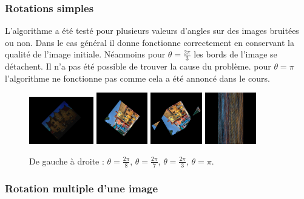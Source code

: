 \subsubsection{Rotations simples}


L'algorithme a été testé pour plusieurs valeurs d'angles sur des images bruitées ou non. Dans le cas général il donne fonctionne correctement en conservant la qualité de l'image initiale. Néanmoins pour $\theta = \frac{2\pi}{3}$ les bords de l'image se détachent. Il n'a pas été possible de trouver la cause du problème. 
pour $\theta = \pi$ l'algorithme ne fonctionne pas comme cela a été annoncé dans le cours. 

\begin{figure}[h]
	\includegraphics[width=0.25\textwidth]{castle_bruite_2pi_over_8.png}
	\includegraphics[width=0.20\textwidth]{house_rotation_2pi_over_7.png}
    \includegraphics[width=0.20\textwidth]{house_rotation_2pi_over_3.png}
    \includegraphics[width=0.20\textwidth]{house_rotation_pi.png}
    \caption{De gauche à droite : $\theta = \frac{2\pi}{8}$, $\theta = \frac{2\pi}{7}$, $\theta = \frac{2\pi}{3}$, $\theta = \pi$. }
    
\end{figure}



\subsubsection{Rotation multiple d'une image}

